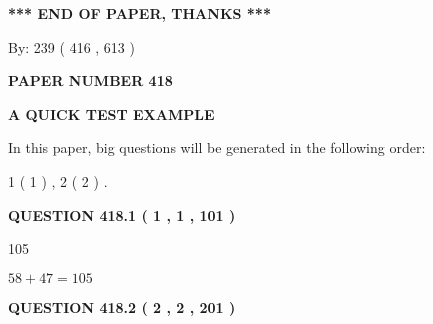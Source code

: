 \documentclass[12pt]{article}
\begin{document}
 
 
 
   
   
 \vspace{0.2in}
 
   
   
   
   
\vspace{1.0in} 
{\textbf{\large{ *** END OF PAPER, THANKS *** }}} 
   
   
\hspace{1.0in} By: 
 239 ( 416 ,  613 )
   
   
   
   
\newpage 
\setcounter{page}{ 
   418001 } 
   
   
   
   
 {\textbf{ \Large{ PAPER NUMBER  418  }}}
   
   
\vspace{0.2in}
   
   
   
   
   
   
 \vspace{0.2in}
{\LARGE {\textbf{ A QUICK TEST EXAMPLE}}}
   
   
   
\vspace{0.2in}
   
In this paper, big questions will be generated in the following order: 
   
   
   1 ( 1 )
 ,
   2 ( 2 )
 .
  
\vspace{0.2in}
  
{\textbf{\Large{QUESTION
418.1 
 ( 1 , 1 , 101 )
}}}
  
  
 
 
\noindent{}

105
 
 
 
 
\noindent{}

$ %
58 +  %
47=   %
105$
 
 
  
\vspace{0.2in}
  
{\textbf{\Large{QUESTION
418.2 
 ( 2 , 2 , 201 )
}}}
  
\end{document}
